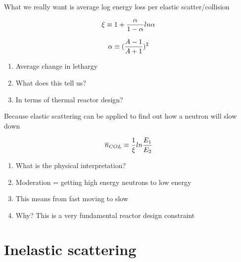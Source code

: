 \documentclass[aspectratio=1610,pdftex,dvipsnames,compress,xcolor={dvipsnames}]{beamer}
\begin{document}
\begin{frame}{What we really want is average log energy loss per elastic scatter/collision}

    \begin{equation}
        \LARGE
        \xi \equiv 1 + \frac{\alpha}{1 - \alpha}ln \alpha
    \end{equation}

    \begin{equation}
        \LARGE
        \alpha \equiv (\frac{A - 1}{A + 1})^2
    \end{equation}

    \vspace*{\fill}

    \begin{enumerate}[series=outerlist,topsep=0pt,itemsep=21pt,leftmargin=*,label=(\arabic*)]
        \item[]Average change in lethargy
        \item[]What does this tell us?
        \item[]In terms of thermal reactor design?
    \end{enumerate}
\end{frame}


\begin{frame}{Because elastic scattering can be applied to find out how a neutron will slow down}

    \begin{equation}
        \LARGE
        \overline{n}_{COL} \equiv \frac{1}{\xi} ln \frac{E_1}{E_2}
    \end{equation}

    \vspace*{\fill}

    \begin{enumerate}[series=outerlist,topsep=0pt,itemsep=21pt,leftmargin=*,label=(\arabic*)]
        \item[]What is the physical interpretation?
        \item[]Moderation = getting high energy neutrons to low energy
        \item[]This means from fast moving to slow
        \item[]Why? This is a very fundamental reactor design constraint
    \end{enumerate}
\end{frame}


\section{Inelastic scattering}
\end{document}
